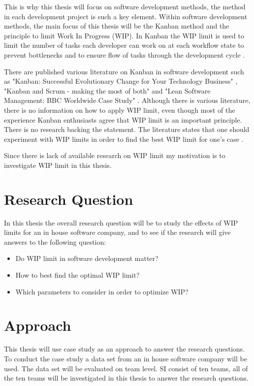 \documentclass[UKenglish]{ifimaster}  %
\begin{document}
This is why this thesis will focus on software development methods, the method in each development project is such a key element. Within software development methods, the main focus of this thesis will be the Kanban method and the principle to limit Work In Progress (WIP). In Kanban the WIP limit is used to  limit the number of tasks each developer can work on at each workflow state to prevent bottlenecks and to ensure flow of tasks through the development cycle \parencite{gandomani2013important} \parencite{ikonen2010exploring}.

There are published various literature on Kanban in software development such as "Kanban: Successful Evolutionary Change for Your Technology Business" \parencite{0984521402}, "Kanban and Scrum - making the most of both"  \parencite{Kniberg} and "Lean Software Management: BBC Worldwide Case Study" \parencite{Joyce}. Although there is various literature, there is no information on how to apply WIP limit, even though most of the experience Kanban enthusiasts agree that WIP limit is an important principle.  There is no research backing the statement.  The literature states that one should experiment with WIP limits in order to find the best WIP limit for one's case \parencite{Ikonen} \parencite{Kniberg}.

Since there is lack of available research on WIP limit my motivation is to investigate WIP limit in this thesis.

\section{Research Question}
\label{chap:RQ}
In this thesis the overall research question will be to study the effects of WIP limits for an in house software company, and to see if the research will give answers to the following question:
\begin{itemize}
\item Do WIP limit in software development matter?
\item How to best find the optimal WIP limit?
\item Which parameters to consider in order to optimize WIP? 
\end{itemize}


\section{Approach}
This thesis will use case study as an approach  to answer the research questions. To conduct the case study a data set from an in house software company will be used.  The data set will be evaluated on team level. SI consist of ten teams, all of the ten teams will be investigated in this thesis to answer the research questions. 
\end{document}
